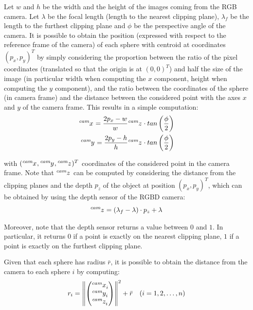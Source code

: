 \documentclass[a4paper]{article}
\newcommand\norm[1]{\left\lVert#1\right\rVert}
\begin{document}
Let $w$ and $h$ be the width and the
height of the images coming from the RGB camera. Let $\lambda$ be
the focal length (length to the nearest clipping
plane), $\lambda_f$ be the length to the furthest clipping plane and
$\phi$ be the perspective angle of the camera. It is possible
to obtain the position (expressed with respect to
the reference frame of the camera) of each sphere with centroid
at coordinates $(p_x, p_y)^T$ by simply considering the proportion
between the ratio of the pixel coordinates (translated so
that the origin is at $(0, 0)^T$) and half the size of the
image (in particular width when computing the $x$ component,
height when computing the $y$ component), and the ratio between
the coordinates of the sphere (in camera frame) and the distance
between the considered point with the axes $x$ and $y$ of the
camera frame. This results in a simple computation:
\begin{align}
    \tensor[^{cam}]{x}{} = \frac{2 p_x - w}{w} \tensor[^{cam}]{z}{} \cdot tan\left(\frac{\phi}{2}\right) \\
    \tensor[^{cam}]{y}{} = \frac{2 p_y - h}{h} \tensor[^{cam}]{z}{} \cdot tan\left(\frac{\phi}{2}\right)
\end{align}

\noindent with $(\tensor[^{cam}]{x}{}, \tensor[^{cam}]{y}{},
\tensor[^{cam}]{z}{})^T$ coordinates of the considered point
in the camera frame. Note that $\tensor[^{cam}]{z}{}$ can be
computed by
considering the distance from the clipping planes and the
depth $p_z$ of the object at position $(p_x, p_y)^T$, which can
be obtained by using the depth sensor of the RGBD camera:
\begin{equation}
    \tensor[^{cam}]{z}{} = (\lambda_f - \lambda) \cdot p_z + \lambda
\end{equation}

Moreover, note that the depth sensor returns a value between $0$ and $1$.
In particular, it returns $0$ if a point is exactly
on the nearest clipping plane, $1$ if a point is exactly on the
furthest clipping plane.

Given that each sphere has radius $\bar{r}$, it is possible to
obtain the distance from the camera to each sphere $i$ by computing:
\begin{equation}
    r_i =
    \norm{
        \begin{pmatrix}
            \tensor[^{cam}]{x}{_i} \\
            \tensor[^{cam}]{y}{_i} \\
            \tensor[^{cam}]{z}{_i}
        \end{pmatrix}
    }^2 + \bar{r} \quad (i = 1, 2, \dots, n)
\end{equation}
\end{document}
